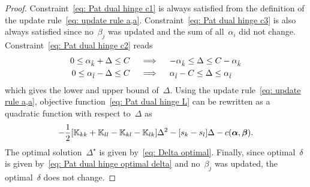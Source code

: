 \begin{proof}
  Constraint~\eqref{eq: Pat dual hinge c1} is always satisfied from the definition of the update rule~\eqref{eq: update rule a,a}. Constraint~\eqref{eq: Pat dual hinge c3} is also always satisfied since no~$\beta_j$ was updated and the sum of all~$\alpha_i$ did not change. Constraint~\eqref{eq: Pat dual hinge c2} reads
  \begin{align*}
    0 \leq \alpha_{\hat{k}} + \Delta \leq C
    & \quad \implies \quad
    - \alpha_{\hat{k}} \leq \Delta \leq C - \alpha_{\hat{k}} \\
    0 \leq \alpha_{\hat{l}} - \Delta \leq C
    & \quad \implies \quad
    \alpha_{\hat{l}} - C \leq \Delta \leq \alpha_{\hat{l}}
  \end{align*}
  which gives the lower and upper bound of~$\Delta.$ Using the update rule~\eqref{eq: update rule a,a}, objective function~\eqref{eq: Pat dual hinge L} can be rewritten as a quadratic function with respect to~$\Delta$ as
  \begin{equation*}
    - \frac{1}{2} \Brac[s]{\K_{kk} + \K_{ll} - \K_{kl} - \K_{lk}} \Delta^2
    - \Brac[s]{s_k - s_l} \Delta
    - c(\bm{\alpha}, \bm{\beta}).
  \end{equation*}
  The optimal solution~$\Delta^{\star}$ is given by~\eqref{eq: Delta optimal}. Finally, since optimal~$\delta$ is given by~\eqref{eq: Pat dual hinge optimal delta} and no~$\beta_j$ was updated, the optimal~$\delta$ does not change.
\end{proof}


